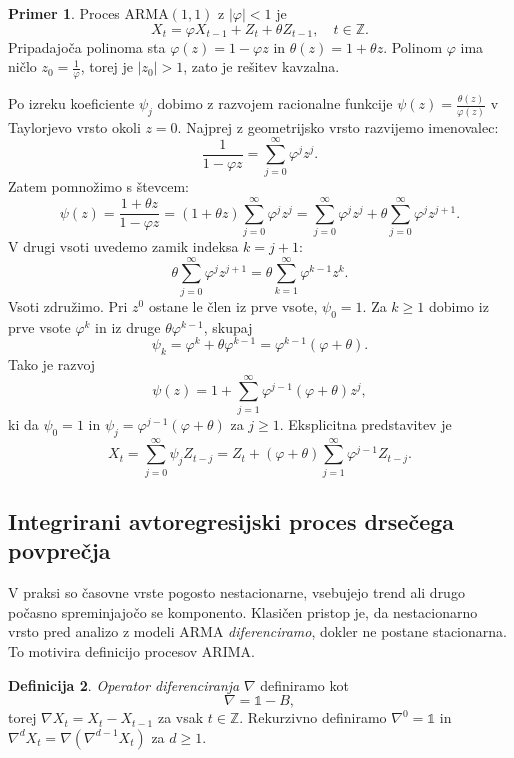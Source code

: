 \documentclass[11pt]{amsart}
\newcommand{\Z}{\mathbb{Z}}
\providecommand{\abs}[1]{\left\lvert #1 \right\rvert}
\theoremstyle{definition}
\newtheorem{definicija}{Definicija}[section]
\newtheorem{primer}[definicija]{Primer}
\theoremstyle{plain}
\begin{document}
\begin{primer}
    Proces $\mathrm{ARMA}(1,1)$ z $\abs{\varphi} < 1$ je
    \[
        X_t = \varphi X_{t-1} + Z_t + \theta Z_{t-1}, \quad t \in \Z.
    \]
    Pripadajoča polinoma sta $\varphi(z) = 1 - \varphi z$ in $\theta(z) = 1 + \theta z$. Polinom 
    $\varphi$ ima ničlo $z_0 = \frac{1}{\varphi}$, torej je $\abs{z_0} > 1$, zato je rešitev kavzalna.
    
    Po izreku koeficiente $\psi_j$ dobimo z razvojem racionalne funkcije 
    $\psi(z) = \frac{\theta(z)}{\varphi(z)}$ v Taylorjevo vrsto okoli $z = 0$. Najprej z geometrijsko 
    vrsto razvijemo imenovalec:
    \[
        \frac{1}{1 - \varphi z} = \sum_{j=0}^{\infty} \varphi^j z^j.
    \]
    Zatem pomnožimo s števcem:
    \[
        \psi(z) = \frac{1 + \theta z}{1 - \varphi z} 
                = (1 + \theta z) \sum_{j=0}^{\infty} \varphi^j z^j
                = \sum_{j=0}^{\infty} \varphi^j z^j + \theta \sum_{j=0}^{\infty} \varphi^j z^{j+1}.
    \]
    V drugi vsoti uvedemo zamik indeksa $k = j + 1$:
    \[
        \theta \sum_{j=0}^{\infty} \varphi^j z^{j+1} = \theta \sum_{k=1}^{\infty} \varphi^{k-1} z^k.
    \]
    Vsoti združimo. Pri $z^0$ ostane le člen iz prve vsote, $\psi_0 = 1$. Za $k \geq 1$ dobimo 
    iz prve vsote $\varphi^k$ in iz druge $\theta \varphi^{k-1}$, skupaj
    \[
        \psi_k = \varphi^k + \theta \varphi^{k-1} = \varphi^{k-1}(\varphi + \theta).
    \]
    Tako je razvoj
    \[
        \psi(z) = 1 + \sum_{j=1}^{\infty} \varphi^{j-1}(\varphi + \theta) z^j,
    \]
    ki da $\psi_0 = 1$ in $\psi_j = \varphi^{j-1}(\varphi + \theta)$ za $j \geq 1$. 
    Eksplicitna predstavitev je
    \[
        X_t = \sum_{j=0}^{\infty} \psi_j Z_{t-j} 
            = Z_t + (\varphi + \theta) \sum_{j=1}^{\infty} \varphi^{j-1} Z_{t-j}.
    \]
\end{primer}

\subsection*{Integrirani avtoregresijski proces drsečega povprečja}

V praksi so časovne vrste pogosto nestacionarne, vsebujejo trend ali drugo počasno 
spreminjajočo se komponento. Klasičen pristop je, da nestacionarno vrsto pred analizo z modeli 
$\mathrm{ARMA}$ \emph{diferenciramo}, dokler ne postane stacionarna. To motivira definicijo 
procesov $\mathrm{ARIMA}$.

\begin{definicija}
    \emph{Operator diferenciranja} $\nabla$ definiramo kot
    \[
        \nabla = \mathds{1} - B,
    \]
    torej $\nabla X_t = X_t - X_{t-1}$ za vsak $t \in \Z$. Rekurzivno definiramo $\nabla^0 = \mathds{1}$ 
    in $\nabla^d X_t = \nabla(\nabla^{d-1} X_t)$ za $d \geq 1$.
\end{definicija}
\end{document}
